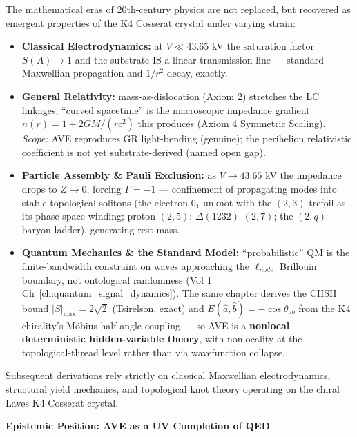 \noindent The mathematical eras of 20th-century physics are not replaced, but recovered as emergent properties of the K4 Cosserat crystal under varying strain:
\begin{itemize}\itemsep 0pt
    \item \textbf{Classical Electrodynamics:} at $V \ll 43.65$ kV the saturation factor $S(A) \to 1$ and the substrate IS a linear transmission line --- standard Maxwellian propagation and $1/r^2$ decay, exactly.
    \item \textbf{General Relativity:} mass-as-dislocation (Axiom 2) stretches the LC linkages; ``curved spacetime'' is the macroscopic impedance gradient $n(r) = 1 + 2GM/(rc^2)$ this produces (Axiom 4 Symmetric Scaling). \emph{Scope:} AVE reproduces GR light-bending (genuine); the perihelion relativistic coefficient is not yet substrate-derived (named open gap).
    \item \textbf{Particle Assembly \& Pauli Exclusion:} as $V \to 43.65$ kV the impedance drops to $Z \to 0$, forcing $\Gamma = -1$\gammaundeclared{} --- confinement of propagating modes into stable topological solitons (the electron $0_1$ unknot with the $(2,3)$ trefoil as its phase-space winding; proton $(2,5)$; $\Delta(1232)$ $(2,7)$; the $(2,q)$ baryon ladder), generating rest mass.
    \item \textbf{Quantum Mechanics \& the Standard Model:} ``probabilistic'' QM is the finite-bandwidth constraint on waves approaching the $\ell_{node}$ Brillouin boundary, not ontological randomness (Vol 1 Ch~\ref{ch:quantum_signal_dynamics}). The same chapter derives the CHSH bound $|S|_{\max} = 2\sqrt{2}$ (Tsirelson, exact) and $E(\hat a,\hat b) = -\cos\theta_{ab}$ from the K4 chirality's M\"obius half-angle coupling --- so AVE is a \textbf{nonlocal deterministic hidden-variable theory}, with nonlocality at the topological-thread level rather than via wavefunction collapse.
\end{itemize}

\noindent Subsequent derivations rely strictly on classical Maxwellian electrodynamics, structural yield mechanics, and topological knot theory operating on the chiral Laves K4 Cosserat crystal.

\vspace{1.5em}
\noindent \textbf{Epistemic Position: AVE as a UV Completion of QED}

